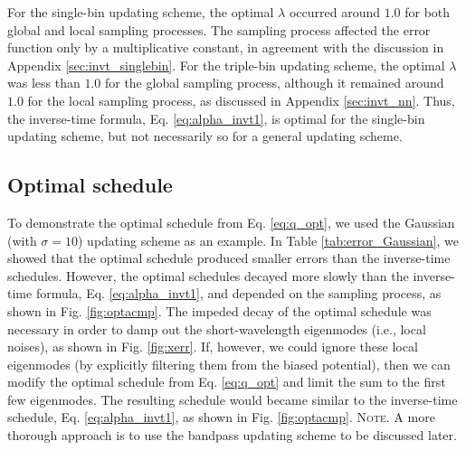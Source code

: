 \documentclass[reprint, floatfix]{revtex4-1}
\newcommand{\note}[1]{{\color{DarkGreen}\footnotesize \textsc{Note.} #1}}
\begin{document}
For the single-bin updating scheme,
the optimal $\lambda$ occurred around $1.0$
for both global and local sampling processes.
%
The sampling process affected the error function
only by a multiplicative constant,
in agreement with the discussion in
Appendix \ref{sec:invt_singlebin}.
%
For the triple-bin updating scheme,
the optimal $\lambda$ was less than $1.0$
for the global sampling process,
although it remained around $1.0$
for the local sampling process,
as discussed in Appendix \ref{sec:invt_nn}.
%
Thus, the inverse-time formula,
Eq. \eqref{eq:alpha_invt1},
is optimal for the single-bin updating scheme,
but not necessarily so for a general updating scheme.





\subsection{\label{sec:results_optschedule}
Optimal schedule}



To demonstrate the optimal schedule from Eq. \eqref{eq:q_opt},
we used the Gaussian (with $\sigma = 10$) updating scheme
as an example.
%
In Table \ref{tab:error_Gaussian},
we showed that the optimal schedule
produced smaller errors than
the inverse-time schedules.
%
However, the optimal schedules
decayed more slowly than
the inverse-time formula, Eq. \eqref{eq:alpha_invt1},
and depended on the sampling process,
as shown in Fig. \ref{fig:optacmp}.
%
The impeded decay of the optimal schedule
was necessary in order to
damp out the short-wavelength eigenmodes
(i.e., local noises),
as shown in Fig. \ref{fig:xerr}.
%
If, however, we could ignore these local eigenmodes
(by explicitly filtering
them from the biased potential),
then we can modify the optimal schedule
from Eq. \eqref{eq:q_opt}
and limit the sum
to the first few eigenmodes.
%
The resulting schedule
would became similar to the inverse-time schedule,
Eq. \eqref{eq:alpha_invt1},
as shown in Fig. \ref{fig:optacmp}.
%
\note{A more thorough approach is
to use the bandpass updating scheme
to be discussed later.
}
\end{document}
